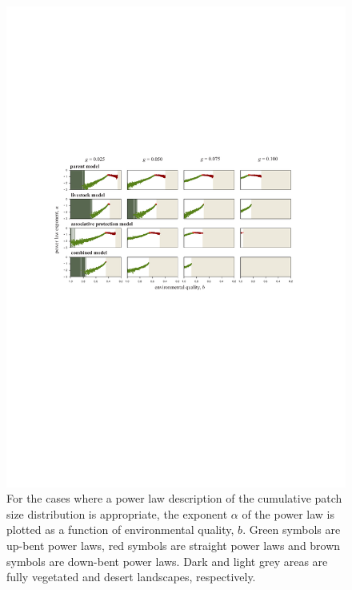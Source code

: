 \begin{figure}[t]%
\includegraphics[width=\columnwidth]{figures/fig4.pdf}%
\caption{For the cases where a power law description of the cumulative patch size distribution is appropriate, the exponent $\alpha$ of the power law is plotted as a function of environmental quality, $b$. Green symbols are up-bent power laws, red symbols are straight power laws and brown symbols are down-bent power laws. Dark and light grey areas are fully vegetated and desert landscapes, respectively. }%
\label{fig:fig4}%
\end{figure}


